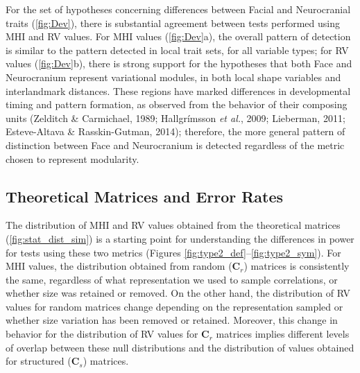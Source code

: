 \documentclass[12pt,twoside]{report}
\begin{document}
For the set of hypotheses concerning differences between Facial and
Neurocranial traits (\autoref{fig:Dev}), there is substantial agreement
between tests performed using MHI and RV values. For MHI values
(\autoref{fig:Dev}a), the overall pattern of detection is similar to the
pattern detected in local trait sets, for all variable types; for RV
values (\autoref{fig:Dev}b), there is strong support for the hypotheses
that both Face and Neurocranium represent variational modules, in both
local shape variables and interlandmark distances. These regions have
marked differences in developmental timing and pattern formation, as
observed from the behavior of their composing units (Zelditch \&
Carmichael, 1989; Hallgrímsson \emph{et al.}, 2009; Lieberman, 2011;
Esteve-Altava \& Rasskin-Gutman, 2014); therefore, the more general
pattern of distinction between Face and Neurocranium is detected
regardless of the metric chosen to represent modularity.

\subsection{Theoretical Matrices and Error
Rates}\label{theoretical-matrices-and-error-rates}

The distribution of MHI and RV values obtained from the theoretical
matrices (\autoref{fig:stat_dist_sim}) is a starting point for
understanding the differences in power for tests using these two metrics
(Figures \ref{fig:type2_def}--\ref{fig:type2_sym}). For MHI values, the
distribution obtained from random ($\mathbf{C}_r$) matrices is
consistently the same, regardless of what representation we used to
sample correlations, or whether size was retained or removed. On the
other hand, the distribution of RV values for random matrices change
depending on the representation sampled or whether size variation has
been removed or retained. Moreover, this change in behavior for the
distribution of RV values for $\mathbf{C}_r$ matrices implies different
levels of overlap between these null distributions and the distribution
of values obtained for structured ($\mathbf{C}_s$) matrices.
\end{document}
